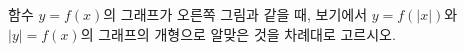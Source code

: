 \noindent\begin{minipage}[t]{0.58\linewidth}\vspace{0pt}\raggedright 함수 $y=f(x)$의 그래프가 오른쪽 그림과 같을 때, 보기에서 $y=f(|x|)$와 $|y|=f(x)$의 그래프의 개형으로 알맞은 것을 차례대로 고르시오.\end{minipage}\hfill\begin{minipage}[t]{0.4\linewidth}\vspace{0pt}\centering \resizebox{\ifdim\width>\linewidth\linewidth\else\width\fi}{!}{}\end{minipage}\par
\noindent \bogi{\resizebox{\ifdim\width>\linewidth\linewidth\else\width\fi}{!}{}}
